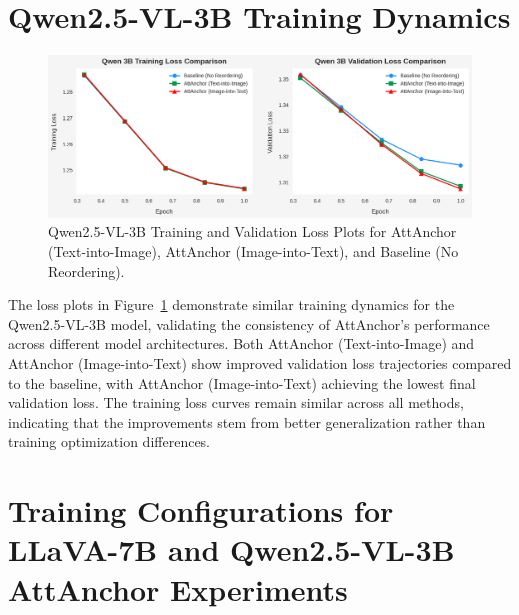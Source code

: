 \documentclass[11pt]{article}
\begin{document}
% 



\section{Qwen2.5-VL-3B Training Dynamics}
\label{app:qwen_training_dynamics}

\begin{figure}[H]
    \centering
    \includegraphics[width=1\linewidth]{qwenloss.png}
    \caption{Qwen2.5-VL-3B Training and Validation Loss Plots for AttAnchor (Text-into-Image), AttAnchor (Image-into-Text), and Baseline (No Reordering).}
    \label{fig:qwen_loss_plot}
\end{figure}

The loss plots in Figure~\ref{fig:qwen_loss_plot} demonstrate similar training dynamics for the Qwen2.5-VL-3B model, validating the consistency of AttAnchor's performance across different model architectures. Both AttAnchor (Text-into-Image) and AttAnchor (Image-into-Text) show improved validation loss trajectories compared to the baseline, with AttAnchor (Image-into-Text) achieving the lowest final validation loss. The training loss curves remain similar across all methods, indicating that the improvements stem from better generalization rather than training optimization differences.




\section{Training Configurations for LLaVA-7B and Qwen2.5-VL-3B AttAnchor Experiments}
\label{app:training_configs}
\end{document}
